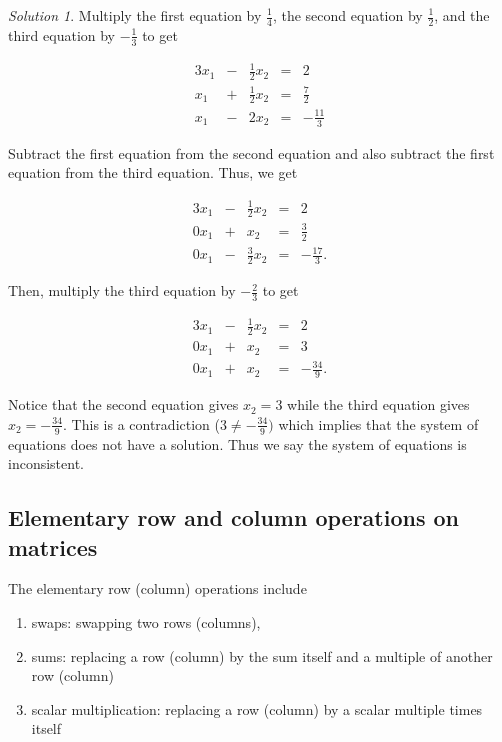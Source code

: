 \documentclass[
]{book}
\providecommand{\tightlist}{%
  \setlength{\itemsep}{0pt}\setlength{\parskip}{0pt}}
\theoremstyle{definition}
\theoremstyle{definition}
\theoremstyle{definition}
\theoremstyle{definition}
\theoremstyle{remark}
\newtheorem*{solution}{Solution}
\begin{document}
\begin{solution}
Multiply the first equation by \(\frac{1}{4}\), the second equation by \(\frac{1}{2}\), and the third equation by \(-\frac{1}{3}\) to get

\begin{alignat*}{3}
x_1 & {}-{} & \frac{1}{2} x_2 & {}={} & 2\\
x_1 & {}+{} & \frac{1}{2} x_2 & {}={} & \frac{7}{2} \\
 x_1 & {}-{} & 2 x_2 &{}={} & -\frac{11}{3}
\end{alignat*}

Subtract the first equation from the second equation and also subtract the first equation from the third equation. Thus, we get

\begin{alignat*}{3}
x_1 & {}-{} & \frac{1}{2} x_2 & {}={} & 2\\
0 x_1 & {}+{} & x_2 & {}={} & \frac{3}{2} \\
0 x_1 & {}-{} & \frac{3}{2} x_2 &{}={} & -\frac{17}{3}.
\end{alignat*}

Then, multiply the third equation by \(-\frac{2}{3}\) to get

\begin{alignat*}{3}
x_1 & {}-{} & \frac{1}{2} x_2 & {}={} & 2\\
0 x_1 & {}+{} & x_2 & {}={} & 3 \\
0 x_1 & {}+{} & x_2 &{}={} & - \frac{34}{9}.
\end{alignat*}

Notice that the second equation gives \(x_2 = 3\) while the third equation gives \(x_2 = -\frac{34}{9}\). This is a contradiction (\(3 \neq -\frac{34}{9})\) which implies that the system of equations does not have a solution. Thus we say the system of equations is inconsistent.
\end{solution}

\hypertarget{elementary-row-and-column-operations-on-matrices}{%
\subsection{Elementary row and column operations on matrices}\label{elementary-row-and-column-operations-on-matrices}}

The elementary row (column) operations include

\begin{enumerate}
\def\labelenumi{\arabic{enumi})}
\tightlist
\item
  swaps: swapping two rows (columns),
\item
  sums: replacing a row (column) by the sum itself and a multiple of another row (column)
\item
  scalar multiplication: replacing a row (column) by a scalar multiple times itself
\end{enumerate}
\end{document}
